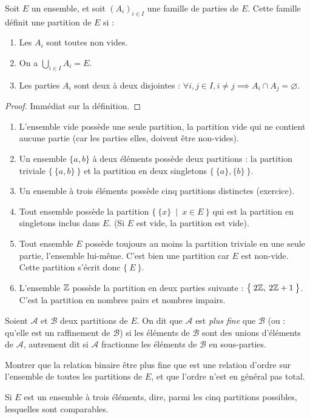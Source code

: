 \begin{proposition}
Soit $E$ un ensemble, et soit $(A_i)_{i\in I}$ une famille de parties de $E$. Cette famille définit une partition de $E$ si :
\begin{enumerate}
\item Les $A_i$ sont toutes non vides.
\item On a $\bigcup_{i\in I} A_i = E$.
\item Les parties $A_i$ sont deux à deux disjointes : $\forall i, j\in I, i\neq j \implies A_i\cap A_j=\varnothing$.
\end{enumerate}
\end{proposition}
\begin{proof}
Immédiat sur la définition.
\end{proof}

\begin{exemple}
\begin{enumerate}
\item L'ensemble vide possède une seule partition, la partition vide qui ne contient aucune partie (car les parties elles, doivent être non-vides).
\item Un ensemble $\{a,b\}$ à deux éléments possède deux partitions : la partition triviale $\big\{\: \{a,b\} \:\big\}$ et la partition en deux singletons $\big\{\: \{a\},\{b\} \:\big\}$.
\item Un ensemble à trois éléments possède cinq partitions distinctes (exercice).
\item Tout ensemble possède la partition $\big\{\: \{x\}\:\mid\: x\in E \:\big\}$ qui est la partition en singletons inclus dans $E$. (Si $E$ est vide, la partition est vide).
\item Tout ensemble  $E$ possède toujours au moins la partition triviale en une seule partie, l'ensemble lui-même. C'est bien une partition car $E$ est non-vide. Cette partition s'écrit donc $\big\{\: E \:\big\}$.
\item L'ensemble $\mathbb{Z}$ possède la partition en deux parties suivante : $\big\{\: 2\mathbb{Z}, \: 2\mathbb{Z}+1\:\big\}$. C'est la partition en nombres pairs et nombres impairs.
\end{enumerate}
\end{exemple}

\begin{exercice}
Soient $\mathcal A$ et $\mathcal B$ deux partitions de $E$. On dit que $\mathcal A$ est \emph{plus fine} que $\mathcal B$ (ou : qu'elle est un raffinement de $\mathcal B$) si les éléments de $\mathcal B$ sont des unions d'éléments de $\mathcal A$, autrement dit si $\mathcal A$ fractionne les éléments de $\mathcal B$ en sous-parties.

Montrer que la relation binaire \og être plus fine que\fg{} est une relation d'ordre sur l'ensemble de toutes les partitions de $E$, et que l'ordre n'est en général pas total.

Si $E$ est un ensemble à trois éléments, dire, parmi les cinq partitions possibles, lesquelles sont comparables.
\end{exercice}

